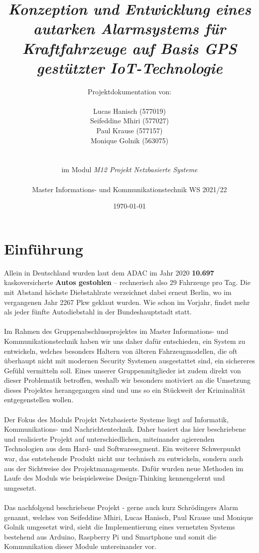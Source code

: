 \documentclass[11pt,a4paper,ngerman]{report}
\date{\today}
\title{ \textbf{\textit{Konzeption und Entwicklung eines autarken Alarmsystems für Kraftfahrzeuge auf Basis GPS gestützter IoT-Technologie}}}
\author{Projektdokumentation von: \\ \\ Lucas Hanisch (577019) \\ Seifeddine Mhiri (577027) \\ Paul Krause (577157)  \\  Monique Golnik (563075) \\ \\ \\ im Modul \textit{ M12 Projekt Netzbasierte Systeme} \\ \\ Master Informations- und Kommunikationstechnik WS 2021/22 }
\begin{document}
	\maketitle
	\tableofcontents
	
\chapter{Einführung}

Allein in Deutschland wurden laut dem ADAC im Jahr 2020 \textbf{10.697} kaskoversicherte \textbf{Autos gestohlen} – rechnerisch also 29 Fahrzeuge pro Tag. Die mit Abstand höchste Diebstahlrate verzeichnet dabei erneut Berlin, wo im vergangenen Jahr 2267 Pkw geklaut wurden. Wie schon im Vorjahr, findet mehr als jeder fünfte Autodiebstahl in der Bundeshauptstadt statt. \cite{Duemmer2021}
\\
\\
Im Rahmen des Gruppenabschlussprojektes im Master Informations- und Kommunikationstechnik haben wir uns daher dafür entschieden, ein System zu entwickeln, welches besonders Haltern von älteren Fahrzeugmodellen, die oft überhaupt nicht mit modernen Security Systemen ausgestattet sind, ein sichereres Gefühl vermitteln soll. Eines unserer Gruppenmitglieder ist zudem direkt von dieser Problematik betroffen, weshalb wir besonders motiviert an die Umsetzung dieses Projektes herangegangen sind und uns so ein Stückweit der Kriminalität entgegenstellen wollen.
\\
\\
Der Fokus des Moduls Projekt Netzbasierte Systeme liegt  auf Informatik, Kommunikations- und  Nachrichtentechnik. Daher basiert das hier beschriebene und realisierte Projekt auf unterschiedlichen, miteinander agierenden Technologien aus dem Hard- und Softwaresegment. Ein weiterer Schwerpunkt war, das entstehende Produkt nicht nur technisch zu entwickeln, sondern auch aus der Sichtweise des Projektmanagements. Dafür wurden neue Methoden im Laufe des Moduls wie beispielsweise Design-Thinking kennengelernt und umgesetzt.
\\
\\
Das nachfolgend beschriebene Projekt - gerne auch kurz  Schrödingers Alarm genannt, welches von Seifeddine Mhiri, Lucas Hanisch, Paul Krause und Monique Golnik umgesetzt wird, sieht die Implementierung eines vernetzten Systems bestehend aus Arduino, Raspberry Pi und Smartphone und somit die Kommunikation dieser Module untereinander vor.
\end{document}
